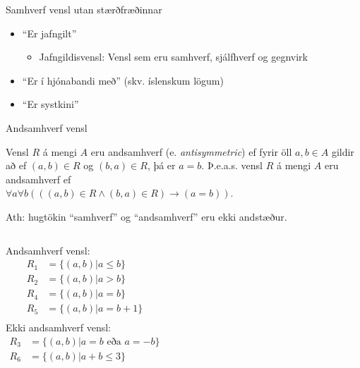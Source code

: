 \documentclass[handout]{beamer}
\begin{document}
\begin{frame}{Samhverf vensl utan stærðfræðinnar}
    \begin{itemize}
        \item ``Er jafngilt''
        \begin{itemize}
            \item Jafngildisvensl: Vensl sem eru samhverf, sjálfhverf og gegnvirk
        \end{itemize}
        \item ``Er í hjónabandi með'' (skv. íslenskum lögum)
        \item ``Er systkini''
    \end{itemize}
\end{frame}

\begin{frame}[fragile]{Andsamhverf vensl}
\begin{tcolorbox}[title=Andsamhverf vensl]
Vensl $R$ á mengi $A$ eru andsamhverf (e. \emph{antisymmetric}) ef fyrir öll $a, b \in A$ gildir að ef $(a, b) \in R$ og $(b, a) \in R$, þá er $a=b$. Þ.e.a.s. vensl $R$ á mengi $A$ eru andsamhverf ef\\ $\forall a \forall b (((a, b) \in R \land (b, a) \in R) \to (a = b))$.
\end{tcolorbox}
Ath: hugtökin ``samhverf'' og ``andsamhverf'' eru ekki andstæður.
\begin{columns}
Andsamhverf vensl:
\begin{align*}
R_1 &= \{(a, b)|a \leq b\}\\
R_2 &= \{(a, b)|a > b\}\\
R_4 &= \{(a, b)|a = b\}\\
R_5 &= \{(a, b)|a = b+1\}\\
\end{align*}
Ekki andsamhverf vensl:
\begin{align*}
R_3 &= \{(a, b)|a = b \text{ eða } a = -b\}\\
R_6 &= \{(a, b)|a+b \leq 3\}\\
\end{align*}
\end{columns}
\end{frame}
\end{document}

